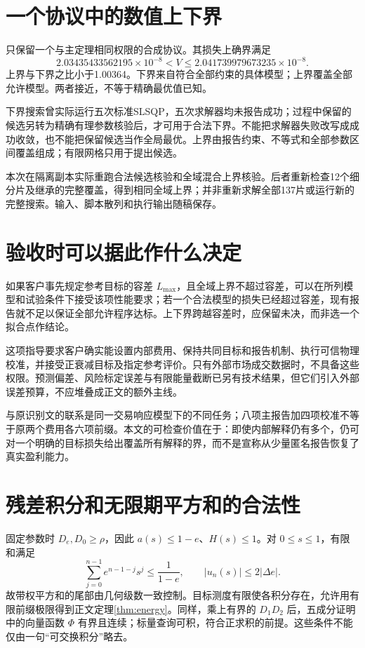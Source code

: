 \documentclass[UTF8,fontset=windows,11pt,a4paper]{ctexart}
\numberwithin{equation}{section}
\begin{document}
\section{一个协议中的数值上下界}
只保留一个与主定理相同权限的合成协议。其损失上确界满足
\begin{equation}
 2.03435433562195\times10^{-8}<V
 \le2.041739979673235\times10^{-8}.
\end{equation}
上界与下界之比小于1.00364。下界来自符合全部约束的具体模型；上界覆盖全部允许模型。两者接近，不等于精确最优值已知。

下界搜索曾实际运行五次标准SLSQP，五次求解器均未报告成功；过程中保留的候选另转为精确有理参数核验后，才可用于合法下界。不能把求解器失败改写成成功收敛，也不能把保留候选当作全局最优。上界由报告约束、不等式和全部参数区间覆盖组成；有限网格只用于提出候选。

本次在隔离副本实际重跑合法候选核验和全域混合上界核验。后者重新检查12个细分片及继承的完整覆盖，得到相同全域上界；并非重新求解全部137片或运行新的完整搜索。输入、脚本散列和执行输出随稿保存。

\section{验收时可以据此作什么决定}
如果客户事先规定参考目标的容差 $L_{\max}$，且全域上界不超过容差，可以在所列模型和试验条件下接受该项性能要求；若一个合法模型的损失已经超过容差，现有报告就不足以保证全部允许程序达标。上下界跨越容差时，应保留未决，而非选一个拟合点作结论。

这项指导要求客户确实能设置内部费用、保持共同目标和报告机制、执行可信物理校准，并接受正衰减目标及指定参考评价。只有外部市场成交数据时，不具备这些权限。预测偏差、风险标定误差与有限能量截断已另有技术结果，但它们引入外部误差预算，不应堆叠成正文的额外主线。

与原识别文的联系是同一交易响应模型下的不同任务；八项主报告加四项校准不等于原两个费用各六项前缀。本文的可检查价值在于：即使内部解释仍有多个，仍可对一个明确的目标损失给出覆盖所有解释的界，而不是宣称从少量匿名报告恢复了真实盈利能力。

\appendix
\section{残差积分和无限期平方和的合法性}
固定参数时 $D_e,D_0\ge\rho$，因此 $a(s)\le1-e$、$H(s)\le1$。对 $0\le s\le1$，有限和满足
\begin{equation}
 \sum_{j=0}^{n-1}e^{n-1-j}s^j\le\frac1{1-e},
 \qquad |u_n(s)|\le2|\Delta e|.
\end{equation}
故带权平方和的尾部由几何级数一致控制。目标测度有限使各积分存在，允许用有限前缀极限得到正文定理\ref{thm:energy}。同样，乘上有界的 $D_1D_2$ 后，五成分证明中的向量函数 $\Phi$ 有界且连续；标量查询可积，符合正求积的前提。这些条件不能仅由一句“可交换积分”略去。
\end{document}
